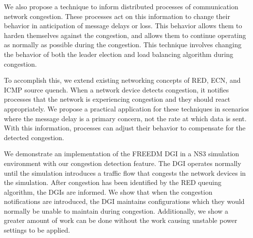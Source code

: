 We also propose a technique to inform distributed processes of communication network congestion.
These processes act on this information to change their behavior in anticipation of message delays or loss.
This behavior allows them to harden themselves against the congestion, and allows them to continue operating as normally as possible during the congestion.
This technique involves changing the behavior of both the leader election\cite{INVITATIONELECTION} and load balancing algorithm during congestion.

To accomplish this, we extend existing networking concepts of \ac{RED}, \ac{ECN}\cite{RFCECN}, and ICMP source quench\cite{RFCSOURCEQUENCH}.
When a network device detects congestion, it notifies processes that the network is experiencing congestion and they should react appropriately.
We propose a practical application for these techniques in scenarios where the message delay is a primary concern, not the rate at which data is sent.
With this information, processes can adjust their behavior to compensate for the detected congestion.

We demonstrate an implementation of the \ac{FREEDM} \ac{DGI} in a \ac{NS3} simulation environment\cite{NS3} with our congestion detection feature.
The \ac{DGI} operates normally until the simulation introduces a traffic flow that congests the network devices in the simulation.
After congestion has been identified by the \ac{RED} queuing algorithm, the \ac{DGI}s are informed. %
We show that when the congestion notifications are introduced, the \ac{DGI} maintains configurations which they would normally be unable to maintain during congestion.
Additionally, we show a greater amount of work can be done without the work causing unstable power settings to be applied.

